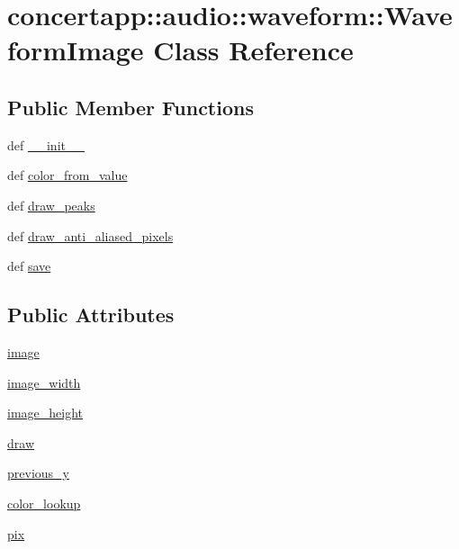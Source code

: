 \hypertarget{classconcertapp_1_1audio_1_1waveform_1_1_waveform_image}{
\section{concertapp::audio::waveform::WaveformImage Class Reference}
\label{classconcertapp_1_1audio_1_1waveform_1_1_waveform_image}
}
\subsection*{Public Member Functions}
\begin{DoxyCompactItemize}
\item 
def \hyperlink{classconcertapp_1_1audio_1_1waveform_1_1_waveform_image_ab49e1f6d0afd1fee519f9b28c62ef07d}{\_\-\_\-init\_\-\_\-}
\item 
def \hyperlink{classconcertapp_1_1audio_1_1waveform_1_1_waveform_image_ab8c6fe4640fb2b56c39624d693297b16}{color\_\-from\_\-value}
\item 
def \hyperlink{classconcertapp_1_1audio_1_1waveform_1_1_waveform_image_a4f5d948dd35852b8262254a4b77ad589}{draw\_\-peaks}
\item 
def \hyperlink{classconcertapp_1_1audio_1_1waveform_1_1_waveform_image_aed31eb699854362bebf45a0357c14e32}{draw\_\-anti\_\-aliased\_\-pixels}
\item 
def \hyperlink{classconcertapp_1_1audio_1_1waveform_1_1_waveform_image_a8ea458380bc9c08abd5bf5bcf6c5f7a5}{save}
\end{DoxyCompactItemize}
\subsection*{Public Attributes}
\begin{DoxyCompactItemize}
\item 
\hyperlink{classconcertapp_1_1audio_1_1waveform_1_1_waveform_image_a0b838b29051d70342f07dc8a3b186435}{image}
\item 
\hyperlink{classconcertapp_1_1audio_1_1waveform_1_1_waveform_image_a0711410fb6613e03b1d46499313dce07}{image\_\-width}
\item 
\hyperlink{classconcertapp_1_1audio_1_1waveform_1_1_waveform_image_ab034d2528b2a864252fd032a5e47646c}{image\_\-height}
\item 
\hyperlink{classconcertapp_1_1audio_1_1waveform_1_1_waveform_image_af94a70a51f22140613a18d664c039486}{draw}
\item 
\hyperlink{classconcertapp_1_1audio_1_1waveform_1_1_waveform_image_a67ecf734425517c997bf204a911af9b6}{previous\_\-y}
\item 
\hyperlink{classconcertapp_1_1audio_1_1waveform_1_1_waveform_image_a1ec94882e8bcfec40655b47c87c62637}{color\_\-lookup}
\item 
\hyperlink{classconcertapp_1_1audio_1_1waveform_1_1_waveform_image_a701bd77fb633bb1f3bf45b5076e1d638}{pix}
\end{DoxyCompactItemize}


